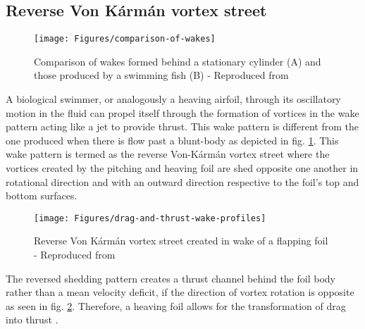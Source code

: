 \subsection{Reverse Von Kármán vortex street} 
\begin{figure}[H]
	\centering
	\texttt{[image: Figures/comparison-of-wakes]}
	\caption{Comparison of wakes formed behind a stationary cylinder (A) and those produced by a swimming fish (B) - Reproduced from \parencite{WillisJay2013}}
	\label{fig:comparison-of-wakes}
\end{figure}
A biological swimmer, or analogously a heaving airfoil, through its oscillatory motion in the fluid can propel itself through the formation of vortices in the wake pattern acting like a jet to provide thrust. This wake pattern is different from the one produced when there is flow past a blunt-body as depicted in fig. \ref{fig:comparison-of-wakes}. This wake pattern is termed as the reverse Von-Kármán vortex street where the vortices created by the pitching and heaving foil are shed opposite one another in rotational direction and with an outward direction respective to the foil’s top and bottom surfaces.
\begin{figure}[H]
	\centering
	\texttt{[image: Figures/drag-and-thrust-wake-profiles]}
	\caption{Reverse Von Kármán vortex street created in wake of a flapping foil - Reproduced from \parencite{Elles2016AnalysisOF}}
	\label{fig:drag-and-thrust-wake-profiles}
\end{figure}
The reversed shedding pattern creates a thrust channel behind the foil body rather than a mean velocity deficit, if the direction of vortex rotation is opposite as seen in fig. \ref{fig:drag-and-thrust-wake-profiles}. Therefore, a heaving foil allows for the transformation of drag into thrust \parencite{Elles2016AnalysisOF}.

